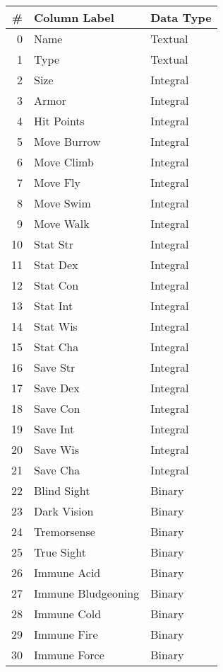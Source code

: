 \documentclass[12pt]{diazessay}
\begin{document}
\begin{table}[!htbp] \centering 
	\caption{\bfseries Initial Dataset} 
	\label{tab:initial-dataset}

\begin{footnotesize}
\begin{minipage}[b]{0.45\linewidth}\centering
\begin{longtable}[]{@{}rll@{}}
	\toprule
	\# & Column Label & Data Type \\
	\midrule
	\endhead
	0 & Name & Textual \\
	1 & Type & Textual \\
	2 & Size & Integral \\
	3 & Armor & Integral \\
	4 & Hit Points & Integral \\
	5 & Move Burrow & Integral \\
	6 & Move Climb & Integral \\
	7 & Move Fly & Integral \\
	8 & Move Swim & Integral \\
	9 & Move Walk & Integral \\
	10 & Stat Str & Integral \\
	11 & Stat Dex & Integral \\
	12 & Stat Con & Integral \\
	13 & Stat Int & Integral \\
	14 & Stat Wis & Integral \\
	15 & Stat Cha & Integral \\
	16 & Save Str & Integral \\
	17 & Save Dex & Integral \\
	18 & Save Con & Integral \\
	19 & Save Int & Integral \\
	20 & Save Wis & Integral \\
	21 & Save Cha & Integral \\
	22 & Blind Sight & Binary \\
	23 & Dark Vision & Binary \\
	24 & Tremorsense & Binary \\
	25 & True Sight & Binary \\
	26 & Immune Acid & Binary \\
	27 & Immune Bludgeoning & Binary \\
	28 & Immune Cold & Binary \\
	29 & Immune Fire & Binary \\
	30 & Immune Force & Binary \\

\end{longtable}
\end{minipage}
\end{footnotesize}
\end{table}
\end{document}

